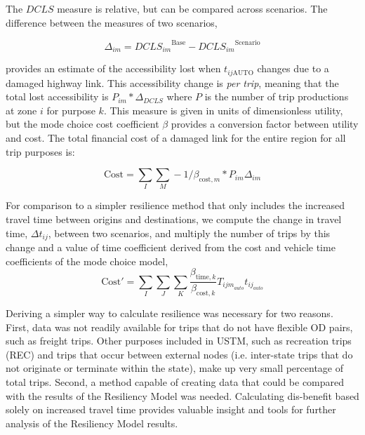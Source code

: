 The \(DCLS\) measure is relative, but can be compared across
scenarios. The difference between the measures of two scenarios,

\begin{equation}
\Delta_{im} = {DCLS_{im}}^{\mathrm{Base}} - {DCLS_{im}}^{\mathrm{Scenario}}
  \label{eq:deltas}
\end{equation}

 \noindent provides an estimate of the accessibility lost when
 \(t_{ij\mathrm{AUTO}}\)
changes due to a damaged highway link. This accessibility change is \emph{per
trip},
meaning that the total lost accessibility is \(P_{im} * \Delta_{DCLS}\) where
\(P\) is
the number of trip productions at zone \(i\) for purpose \(k\). This measure is
given in units of dimensionless utility, but the mode choice cost coefficient
\(\beta\) provides a conversion factor between utility and cost. The total
financial
cost of a damaged link for the entire region for all trip purposes is:

\begin{equation}
\mathrm{Cost} = \sum_{I}\sum_{M} -1 / \beta_{\mathrm{cost},m} * P_{im}
\Delta_{im}
  \label{eq:totalcost}
\end{equation}

For comparison to a simpler resilience method that only includes the increased
travel time between origins and destinations, we compute the change in travel
time, \(\Delta t_{ij}\), between two scenarios, and multiply the number of trips by this change
and a value of time coefficient derived from the cost and vehicle time
coefficients of the mode choice model,
\begin{equation}
\mathrm{Cost}' =  \sum_I \sum_J \sum_K \frac{\beta_{\mathrm{time}, k}
}{\beta_{\mathrm{cost}, k}} T_{{ijm}_{auto}} t_{{ij}_{auto}}
  \label{eq:ttmethod}
\end{equation}

\noindent Deriving a simpler way to calculate resilience was necessary for two
reasons. First, data was not readily available for trips that do not have
flexible OD pairs, such as freight trips. Other purposes included in USTM,
such as recreation trips (REC) and trips that occur between external nodes
(i.e. inter-state trips that do not originate or terminate within the state),
make up very small percentage of total trips. Second, a method capable of
creating data that could be compared with the results of the Resiliency Model
was needed. Calculating dis-benefit
based solely on increased travel time provides valuable insight and tools for
further analysis of the Resiliency Model results.

